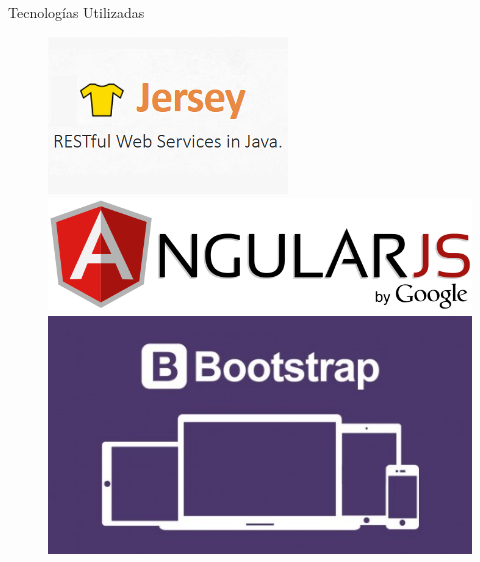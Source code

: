 \documentclass{beamer}
\begin{document}
\begin{frame}{Tecnologías Utilizadas}
                \begin{figure}
                    \centering
                    \begin{minipage}{0.32\textwidth}
                        \includegraphics[width=\textwidth]{res/logo-jersey}
                    \end{minipage}
                    \begin{minipage}{0.32\textwidth}
                        \includegraphics[width=\textwidth]{res/logo-angular}
                    \end{minipage}
                    \begin{minipage}{0.32\textwidth}
                        \includegraphics[width=\textwidth]{res/logo-bootstrap}
                    \end{minipage}
                \end{figure}
            \end{frame}
\end{document}

